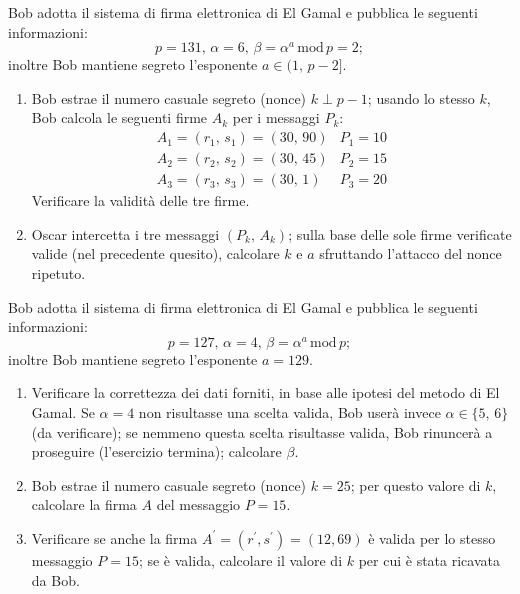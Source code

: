         Bob adotta il sistema di firma elettronica di El Gamal e pubblica le seguenti informazioni: \[
            p=131,\, \alpha = 6,\, \beta = \alpha^a\,\mathrm{mod}\,p=2
        ;\] inoltre Bob mantiene segreto l'esponente $a\in (1,\,p-2]$.
        \begin{enumerate}
            \item Bob estrae il numero casuale segreto (nonce) $k\perp p-1$; usando lo stesso $k$, 
                Bob calcola le seguenti firme $A_k$ per i messaggi $P_k$:
                \[\begin{array}{ll}
                    A_1=(r_1,\,s_1)=(30,\,90) & P_1=10\\
                    A_2=(r_2,\,s_2)=(30,\,45) & P_2=15\\
                    A_3=(r_3,\,s_3)=(30,\,1) & P_3=20
                \end{array}\]
                Verificare la validità delle tre firme.
            \item Oscar intercetta i tre messaggi $(P_k,\,A_k)$; sulla base delle sole firme verificate valide 
                (nel precedente quesito), calcolare $k$ e $a$ sfruttando l'attacco del nonce ripetuto.
        \end{enumerate}

        Bob adotta il sistema di firma elettronica di El Gamal e pubblica le seguenti informazioni: \[
            p=127,\, \alpha = 4,\, \beta = \alpha^a\,\mathrm{mod}\,p
        ;\] inoltre Bob mantiene segreto l'esponente $a=129$.
        \begin{enumerate}
            \item Verificare la correttezza dei dati forniti, in base alle ipotesi del metodo di El Gamal. 
                Se $\alpha=4$ non risultasse una scelta valida, Bob userà invece $\alpha\in \{5,\,6\}$ 
                (da verificare); se nemmeno questa scelta risultasse valida, Bob rinuncerà a proseguire 
                (l'esercizio termina); calcolare $\beta$.
            \item Bob estrae il numero casuale segreto (nonce) $k=25$; per questo valore di $k$, calcolare 
                la firma $A$ del messaggio $P=15$.
            \item Verificare se anche la firma $A^{\prime}=(r^{\prime}, s^{\prime})=(12,69)$ è valida per 
                lo stesso messaggio $P=15$; se è valida, calcolare il valore di $k$ per cui è stata ricavata da Bob.
        \end{enumerate}

